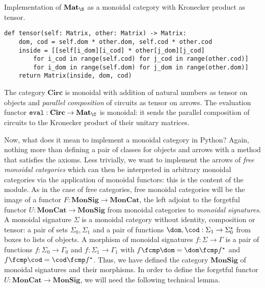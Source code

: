 \begin{python}
{\normalfont Implementation of $\mathbf{Mat}_\S$ as a monoidal category with Kronecker product as tensor.}

\begin{verbatim}
def tensor(self: Matrix, other: Matrix) -> Matrix:
    dom, cod = self.dom * other.dom, self.cod * other.cod
    inside = [[self[i_dom][i_cod] * other[j_dom][j_cod]
        for i_cod in range(self.cod) for j_cod in range(other.cod)]
        for i_dom in range(self.dom) for j_dom in range(other.dom)]
    return Matrix(inside, dom, cod)
\end{verbatim}
\end{python}

\begin{example}
The category $\mathbf{Circ}$ is monoidal with addition of natural numbers as tensor on objects and \emph{parallel composition} of circuits as tensor on arrows.
The evaluation functor $\mathtt{eval} : \mathbf{Circ} \to \mathbf{Mat}_\C$ is monoidal: it sends the parallel composition of circuits to the Kronecker product of their unitary matrices.
\end{example}

Now, what does it mean to implement a monoidal category in Python?
Again, nothing more than defining a pair of classes for objects and arrows with a  method that satisfies the axioms.
Less trivially, we want to implement the arrows of \emph{free monoidal categories} which can then be interpreted in arbitrary monoidal categories via the application of monoidal functors: this is the content of the  module.
As in the case of free categories, free monoidal categories will be the image of a functor $F : \mathbf{MonSig} \to \mathbf{MonCat}$, the left adjoint to the forgetful functor $U : \mathbf{MonCat} \to \mathbf{MonSig}$ from monoidal categories to \emph{monoidal signatures}.
A monoidal signature $\Sigma$ is a monoidal category without identity, composition or tensor: a pair of sets $\Sigma_0, \Sigma_1$ and a pair of functions $\dom, \cod : \Sigma_1 \to \Sigma_0^\star$ from boxes to lists of objects.
A morphism of monoidal signatures $f : \Sigma \to \Gamma$ is a pair of functions $f : \Sigma_0 \to \Gamma_0$ and $f : \Sigma_1 \to \Gamma_1$ with $f \fcmp \dom = \dom \fcmp f^\star$ and $f \fcmp \cod = \cod \fcmp f^\star$.
Thus, we have defined the category $\mathbf{MonSig}$ of monoidal signatures and their morphisms.
In order to define the forgetful functor $U : \mathbf{MonCat} \to \mathbf{MonSig}$, we will need the following technical lemma.

